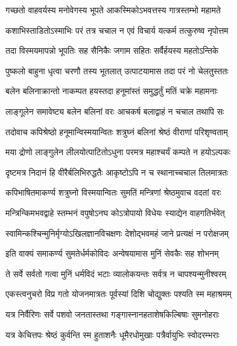 \twolineshloka
{गच्छतो वाहवर्यस्य मनोवेगस्य भूपते}
{आकस्मिकोऽभवत्तस्य गात्रस्तम्भो महामते}%

\twolineshloka
{कशाभिस्ताडितोऽस्माभिः परं तत्र चचाल न}
{एवं विचार्य यत्कर्म तत्कुरुष्व नृपोत्तम}%

\twolineshloka
{तदा विस्मयमापन्नो भूपतिः सह सैनिकैः}
{जगाम सहितः सर्वैर्हयस्य महतोऽन्तिके}%

\twolineshloka
{पुष्कलो बाहुना धृत्वा चरणौ तस्य भूतलात्}
{उत्पाटयामास तदा परं नो चेलतुस्ततः}%

\twolineshloka
{बलेन बलिनाक्रान्तो नाकम्पत हयस्तदा}
{हनूमांस्तं समुद्धर्तुं मतिं चक्रे महामनाः}%

\twolineshloka
{लाङ्गूलेन समावेष्ट्य बलेन बलिनां वरः}
{आचकर्ष बलाद्वाहं न चचाल तथापि सः}%

\twolineshloka
{तदोवाच कपिश्रेष्ठो हनूमान्विस्मयान्वितः}
{शत्रुघ्नं बलिनां श्रेष्ठं वीराणां परिशृण्वताम्}%

\twolineshloka
{मया द्रोणो लाङ्गुलेन लीलयोत्पाटितोऽधुना}
{परमत्र महाश्चर्यं कम्पते न हयोऽल्पकः}%

\twolineshloka
{दृष्टमत्र निदानं हि वीरैर्बलिभिरुद्धतैः}
{आकृष्टोऽपि न च स्थानाच्चचाल तिलमात्रतः}%

\twolineshloka
{कपिभाषितमाकर्ण्य शत्रुघ्नो विस्मयान्वितः}
{सुमतिं मन्त्रिणां श्रेष्ठमुवाच वदतां वरः}%


\twolineshloka
{मन्त्रिन्किमभवद्वाहे स्तम्भनं वपुषोऽनघ}
{कोऽत्रोपायो विधेयः स्याद्येन वाहगतिर्भवेत्}%


\twolineshloka
{स्वामिन्कश्चिन्मुनिर्मृग्योऽखिलज्ञानविचक्षणः}
{देशोद्भवमहं जाने प्रत्यक्षं न परोक्षजम्}%


\twolineshloka
{इति वाक्यं समाकर्ण्य सुमतेर्धर्मकोविदः}
{अन्वेषयामास मुनिं सेवकैः सह शोभनम्}%

\twolineshloka
{ते सर्वे सर्वतो गत्वा मुनिं धर्मविदं भटाः}
{व्यालोकयन्तः सर्वत्र न चापश्यन्मुनीश्वरम्}%

\twolineshloka
{एकस्त्वनुचरो विप्र गतो योजनमात्रतः}
{पूर्वस्यां दिशि चोद्युक्तः पश्यति स्म महाश्रमम्}%

\twolineshloka
{यत्र निर्वैरिणः सर्वे पशवो जनतास्तथा}
{गङ्गास्नानहताशेषकिल्बिषाः सुमनोहराः}%

\twolineshloka
{यत्र केचित्तपः श्रेष्ठं कुर्वन्ति स्म हुताशनैः}
{धूमैरधोमुखाः पत्रैर्वायुभिः स्वोदरम्भराः}%


